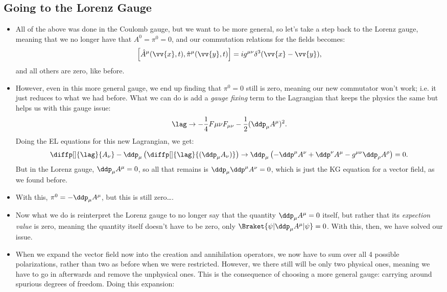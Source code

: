 \subsection*{Going to the Lorenz Gauge}
\begin{itemize}
    \item All of the above was done in the Coulomb gauge, but we want to be more general, so let's take a step back to the Lorenz gauge, meaning that we no longer have that $A^{0} = \pi^0 = 0$, and our commutation relations for the fields becomes:
        \begin{equation}
            \left[ \hat{A}^{\mu}(\vv{x},t),\hat{\pi}^{\mu}(\vv{y},t) \right] = ig^{\mu\nu}\delta^3(\vv{x}-\vv{y}),
        \end{equation}
        and all others are zero, like before.
    \item However, even in this more general gauge, we end up finding that $\pi^0=0$ still is zero, meaning our new commutator won't work; i.e. it just reduces to what we had before. What we can do is add a \textit{gauge fixing} term to the Lagrangian that keeps the physics the same but helps us with this gauge issue:
        \begin{equation*}
            \lag \rightarrow -\frac{1}{4}F{\mu\nu}F_{\mu\nu} - \frac{1}{2}(\ddp_{\mu}A^{\mu})^2.
        \end{equation*}
        Doing the EL equations for this new Lagrangian, we get:
        \begin{equation*}
            \diffp[]{\lag}{A_{\nu}} - \ddp_{\mu}\left( \diffp[]{\lag}{(\ddp_{\mu}A_{\nu})} \right) \rightarrow \ddp_{\mu}\left( -\ddp^{\mu}A^{\nu} + \ddp^{\nu}A^{\mu} - g^{\mu\nu}\ddp_{\rho}A^{\rho} \right) = 0.
        \end{equation*}
        But in the Lorenz gauge, $\ddp_{\mu}A^{\mu}=0$, so all that remains is $\ddp_{\mu}\ddp^{\mu}A^{\nu} = 0$, which is just the KG equation for a vector field, as we found before.
    \item With this, $\pi^0 = -\ddp_{\mu}A^{\mu}$, but this is still zero\ldots. 
    \item Now what we do is reinterpret the Lorenz gauge to no longer say that the quantity $\ddp_{\mu}A^{\mu}=0$ itself, but rather that its \textit{expection value} is zero, meaning the quantity itself doesn't have to be zero, only $\Braket{\psi | \ddp_{\mu}A^{\mu} | \psi} = 0$. With this, then, we have solved our issue.
    \item When we expand the vector field now into the creation and annihilation operators, we now have to sum over all 4 possible polarizations, rather than two as before when we were restricted. However, we there still will be only two physical ones, meaning we have to go in afterwards and remove the unphysical ones. This is the consequence of choosing a more general gauge: carrying around spurious degrees of freedom. Doing this expansion:

\end{itemize}
